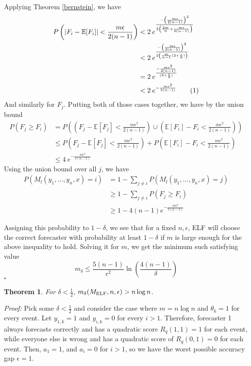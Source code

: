 \documentclass[letterpaper,12pt]{article}
\newcommand{\E}{\mathbb{E}}
\newcommand{\1}{\mathbbm{1}}
\newcommand*{\QED}{\hfill\ensuremath{\square}}%
\newcommand\numberthis{\addtocounter{equation}{1}\tag{\theequation}}
\newtheorem{theorem}{Theorem}
\begin{document}
Applying Theorem \ref{bernstein}, we have
\begin{align*}
    P\left(\left| F_i - \E[F_i]\right| < \frac{m \epsilon}{2(n - 1)} \right) 
    &< 2 \: e^{\frac{-\left(\frac{m \epsilon}{2(n - 1)}\right)^2 }{2\left(\frac{2m}{n} + \frac{m \epsilon}{6(n - 1)}\right)}} \\
    &< 2 \: e^{\frac{-\left(\frac{m \epsilon}{2(n - 1)}\right)^2 }{2\left(\frac{m}{n-1}(2 + \frac{\epsilon}{6}) \right)}} \\
    &= 2 \: e^{\frac{-\frac{m \epsilon^2}{2(n - 1)} }{(2 + \frac{\epsilon}{6})}} \\
    &< 2 \: e^{-\frac{m \epsilon^2}{5(n - 1)} }  \numberthis \label{elf_bernstein} 
\end{align*}
And similarly for $F_j$. Putting both of those cases together, we have by the union bound
\begin{align*}
  P(F_j \geq F_i) &= P\left(\left(F_j - \E[F_j] < \frac{m \epsilon^2}{2(n - 1)}\right) \cup \left(\E[F_i] - F_i < \frac{m \epsilon^2}{2(n - 1)} \right) \right) \\
  &\leq P\left(F_j - \E[F_j] < \frac{m \epsilon^2}{2(n - 1)}\right) + P\left(\E[F_i] - F_i < \frac{m \epsilon^2}{2(n - 1)} \right) \\
  &\leq 4 \: e^{-\frac{m \epsilon^2}{5(n - 1)} }
\end{align*}
Using the union bound over all $j$, we have
\begin{align*}
  P\left(M_l(y_1, ..., y_n, x) = i\right)
  &= 1 - \sum_{j\neq i} P\left(M_l(y_1, ..., y_n, x) = j\right) \\
  &\geq 1 - \sum_{j\neq i} P\left(F_j \geq F_i\right) \\
  &\geq 1 - 4 (n-1) e^{-\frac{m \epsilon^2}{5(n - 1)}} 
\end{align*}

Assigning this probability to $1 - \delta$, we see that for a fixed $n, \epsilon$, ELF will choose the correct forecaster with probability at least $1 - \delta$ if $m$ is large enough for the above inequality to hold. Solving it for $m$, we get the minimum such satisfying value
\[m_\delta \leq \frac{5(n-1)}{\epsilon^2}\ln\left(\frac{4(n-1)}{\delta}\right) \]
\hfill\QED

\begin{theorem}
  \label{elf_lower_bound}
    For $\delta < \frac{1}{2}$, $m_\delta(M_{\mathrm{ELF}}, n, \epsilon) > n \log n$.
\end{theorem}
\emph{Proof:} Pick some $\delta < \frac{1}{2}$ and consider the case where $m = n \log n$ and $\theta_k = 1$ for every event. Let $y_{1, k} = 1$ and $y_{i, k} = 0$ for every $i > 1$. Therefore, forecaster 1 always forecasts correctly and has a quadratic score $R_q(1, 1) = 1$ for each event, while everyone else is wrong and has a quadratic score of $R_q(0, 1) = 0$ for each event. Then, $a_1 = 1$, and $a_i = 0$ for $i > 1$, so we have the worst possible accuracy gap $\epsilon = 1$.
\end{document}
